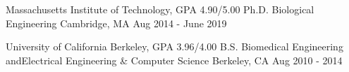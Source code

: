 
\begin{cventries}
  \cventry
    {Massachusetts Institute of Technology, GPA 4.90/5.00} %
    {Ph.D. Biological Engineering} %
    {Cambridge, MA} %
    {Aug 2014 - June 2019} %
    {
    }

\vspace{-0.5\baselineskip}

  \cventry
    {{\vspace{-1.25\baselineskip}}University of California Berkeley, GPA 3.96/4.00} %
    {B.S. Biomedical Engineering {\normalfont{}and}\newline{}Electrical Engineering \& Computer Science{\vspace{-\baselineskip}}} %
    {Berkeley, CA} %
    {Aug 2010 - 2014} %
    {
    }

\end{cventries}
